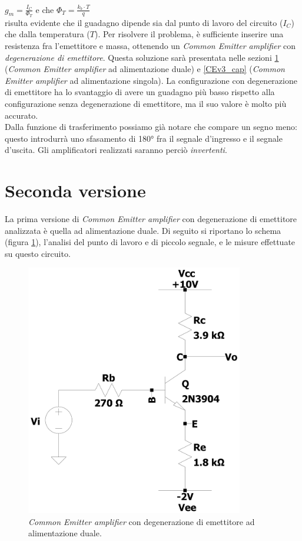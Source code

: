 \documentclass{report}
\begin{document}
\\[2pt]\indent $\displaystyle{g_m=\frac{I_C}{\Phi_T}}$ e che $\displaystyle{\Phi_T=\frac{k_b\cdot T}{q}}$
\\[2pt]risulta evidente che il guadagno dipende sia dal punto di lavoro del circuito ($I_C$) che dalla temperatura ($T$). Per risolvere il problema, è sufficiente inserire una resistenza fra l'emettitore e massa, ottenendo un \textit{Common Emitter amplifier} con \textit{degenerazione di emettitore}. Questa soluzione sarà presentata nelle sezioni \ref{CEv2_cap} (\textit{Common Emitter amplifier} ad alimentazione duale) e \ref{CEv3_cap} (\textit{Common Emitter amplifier} ad alimentazione singola). 
La configurazione con degenerazione di emettitore ha lo svantaggio di avere un guadagno più basso rispetto alla configurazione senza degenerazione di emettitore, ma il suo valore è molto più accurato. 
\\ Dalla funzione di trasferimento possiamo già notare che compare un segno meno: questo introdurrà uno sfasamento di 180° fra il segnale d'ingresso e il segnale d'uscita. Gli amplificatori realizzati saranno perciò \textit{invertenti}.
\section{Seconda versione} \label{CEv2_cap}%
La prima versione di \textit{Common Emitter amplifier} con degenerazione di emettitore analizzata è quella ad alimentazione duale. Di seguito si riportano lo schema (figura \ref{figura:CEv2}), l'analisi del punto di lavoro e di piccolo segnale, e le misure effettuate su questo circuito. 
\begin{figure}[h]
\centering
\includegraphics[height=11cm]{immagini/CEv2}
\caption{\textit{Common Emitter amplifier} con degenerazione di emettitore ad alimentazione duale.}
\label{figura:CEv2}
\end{figure}
\end{document}
